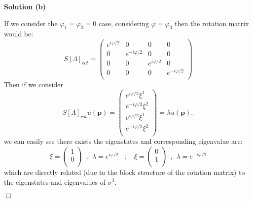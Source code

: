 \documentclass[12pt]{article}
\newcommand{\qedwhite}{\hfill \ensuremath{\Box}}
\begin{document}
\color{blue}

\textbf{Solution (b)}

If we consider the $\varphi_1 = \varphi_2 = 0$ case, considering $\varphi = \varphi_3$ then the rotation matrix would be:
\[
    S[\Lambda]_{rot} = 
    \begin{pmatrix}
        e^{i\varphi/2} & 0               & 0              & 0               \\ 
        0              & e^{-i\varphi/2} & 0              & 0               \\
        0              & 0               & e^{i\varphi/2} & 0               \\
        0              & 0               & 0              & e^{-i\varphi/2} \\
    \end{pmatrix}
\]
Then if we consider
\[
    S[\Lambda]_{rot} u(\mathbf{p}) = 
    \begin{pmatrix}
        e^{i\varphi/2}\xi^1  \\
        e^{-i\varphi/2}\xi^2 \\
        e^{i\varphi/2}\xi^1  \\
        e^{-i\varphi/2}\xi^2 \\
    \end{pmatrix} =
    \lambda u(\mathbf{p}),
\]
we can easily see there exists the eigenstates and corresponding eigenvalue are:
\[
    \xi = 
    \begin{pmatrix}
        1 \\
        0 \\
    \end{pmatrix}~~,~~ \lambda = e^{i\varphi/2}~~~~;~~~~
    \xi = 
    \begin{pmatrix}
        0 \\
        1 \\
    \end{pmatrix}~~,~~ \lambda = e^{-i\varphi/2}
\]
which are directly related (due to the block structure of the rotation matrix) to the eigenstates and eigenvalues of $\sigma^3$.

\qedwhite

\color{black}
\end{document}
